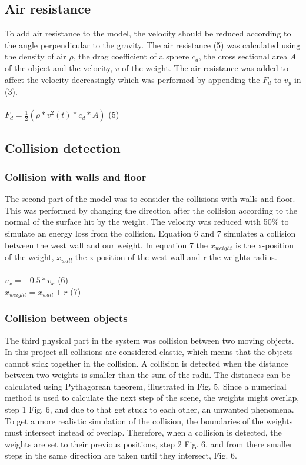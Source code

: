\documentclass[a4paper,12pt,twoside,english]{article}
\begin{document}
 
\subsection{Air resistance}
To add air resistance to the model, the velocity should be reduced according to the angle perpendicular to the gravity. The air resistance (5) was calculated using the density of air ${\rho}$, the drag coefficient of a sphere $c_d$, the cross sectional area {\itshape A}  of the object and the velocity, $v$ of the weight.
The air resistance was added to affect the velocity decreasingly which was performed by appending the $F_d$ to $v_y$ in (3).\\ \\
$F_d = \frac{1}{2}( \rho * v^2(t) * c_{d} * A)$ \hfill (5) 

\subsection{Collision detection}
\subsubsection{Collision with walls and floor}
The second part of the model was to consider the collisions with walls and floor. This was performed by changing the direction after the collision according to the normal of the surface hit by the weight. The velocity was reduced with 50\%  to simulate an energy loss from the collision.  Equation 6 and 7 simulates a collision between the west wall and our weight. In equation 7 the $x_{weight}$ is the x-position of the weight, $x_{wall}$ the x-position of the west wall and r the weights radius.  \\ \\
$v_x= -0.5*v_x$ \hfill (6) \\
$x_{weight} = x_{wall}+ r$ \hfill (7)

\subsubsection{Collision between objects}
The third physical part in the system was collision between two moving objects. In this project all collisions are considered elastic, which means that the objects cannot stick together in the collision.
A collision is detected when the distance between two weights is smaller than the sum of the radii. The distances can be calculated using Pythagorean theorem, illustrated in Fig. 5. 
Since a numerical method is used to calculate the next step of the scene, the weights might overlap, step 1 Fig. 6, and due to that get stuck to each other, an unwanted phenomena. To get a more realistic simulation of the collision, the boundaries of the weights must intersect instead of overlap. Therefore, when a collision is detected, the weights are set to their previous positions, step 2 Fig. 6, and from there smaller steps in the same direction are taken until they intersect, Fig. 6. 
\end{document}
